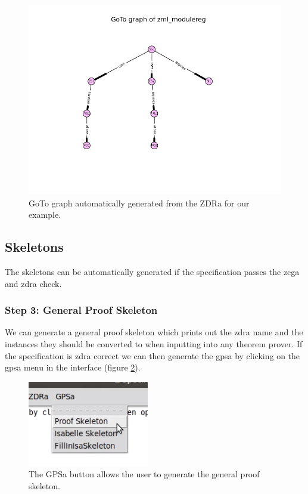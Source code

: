 \begin{figure}[H]
\centering
\includegraphics[scale=0.7]{Figures/fullexample/goto_fullexample.jpg}
\caption{GoTo graph automatically generated from the ZDRa for our example. \label{fig:gotoexample}}
\end{figure}

\subsection{Skeletons}

The skeletons can be automatically generated if the specification passes the
\gls{zcga} and \gls{zdra} check.

\subsubsection{Step 3: General Proof Skeleton}

We can generate a general proof skeleton which prints out the \gls{zdra} name
and the instances they should be converted to when inputting into any theorem
prover. If the specification is \gls{zdra} correct we can then generate the
\gls{gpsa} by clicking on the \gls{gpsa} menu in the interface (figure
\ref{fig:gpsabutton}).

\begin{figure}[H]
\centering
\includegraphics[scale=1]{Figures/fullexample/proofskelbutton.png}
\caption{The GPSa button allows the user to generate the general proof skeleton. \label{fig:gpsabutton}}
\end{figure}

